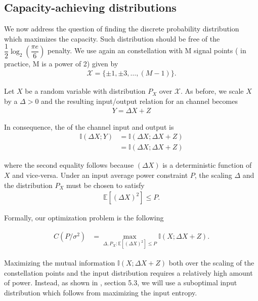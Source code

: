\subsection{Capacity-achieving distributions}
We now address the question of finding the discrete probability distribution which maximizes the capacity. Such distribution should be free of the $ \dfrac{1}{2} \log_{2} \left(\dfrac{\pi e}{6}\right)$ penalty. We use again an  constellation with M signal points ( in practice, M is a power of 2) given by 
\begin{align}
	\mathcal{X} = \{\pm 1, \pm 3,\dots, (M-1)\}.
\end{align}

Let $X$ be a random variable with distribution $P_X$ over $\mathcal{X}$. As before, we scale $X$ by a $\Delta > 0$ and the resulting input/output relation for an  channel becomes
\begin{align}
	Y = \Delta X + Z
\end{align}

In consequence, the  of the channel input and output is 
\begin{align}
	\mathbb{I}(\Delta X; Y) &= \mathbb{I}(\Delta X; \Delta X + Z)\\
	&= \mathbb{I}(\Delta X; \Delta X + Z)
\end{align}

where the second equality follows because $(\Delta X)$ is a deterministic function of $X$ and vice-versa. Under an input average power constraint $P$, the scaling $\Delta$ and the distribution $P_X$ must be chosen to satisfy
\begin{align}
	\mathbb{E}[(\Delta X)^2] \leq P.
\end{align}

Formally, our optimization problem is the following

\begin{align}
	C(P/\sigma^2) &= \max\limits_{\Delta, P_X :\mathbb{E}[(\Delta X)^2] \leq P} \mathbb{I}(X;\Delta X+Z).
\end{align}

Maximizing the mutual information $\mathbb{I}(X;\Delta X+Z)$ both over the scaling of the constellation points and the input distribution requires a relatively high amount of power. Instead, as shown in \cite{BoechererCM}, section 5.3, we will use a suboptimal input distribution which follows from maximizing the input entropy.

